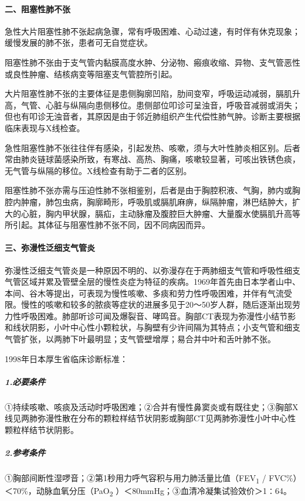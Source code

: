 \paragraph{二、阻塞性肺不张}

急性大片阻塞性肺不张起病急骤，常有呼吸困难、心动过速，有时伴有休克现象；缓慢发展的肺不张，患者可无自觉症状。

阻塞性肺不张由于支气管内黏膜高度水肿、分泌物、瘢痕收缩、异物、支气管恶性或良性肿瘤、结核病变等阻塞支气管腔所引起。

大片阻塞性肺不张的主要体征是患侧胸廓凹陷，肋间变窄，呼吸运动减弱，膈肌升高，气管、心脏与纵隔向患侧移位。患侧部位叩诊可呈浊音，呼吸音减弱或消失；但也有叩诊无浊音者，其原因是由于邻近肺组织产生代偿性肺气肿。诊断主要根据临床表现与X线检查。

急性阻塞性肺不张往往伴有感染，引起发热、咳嗽，须与大叶性肺炎相区别。后者常由肺炎链球菌感染所致，有寒战、高热、胸痛，咳嗽较显著，可咳出铁锈色痰，无气管与纵隔的移位。X线检查有助于二者的区别。

阻塞性肺不张亦需与压迫性肺不张相鉴别，后者是由于胸腔积液、气胸，肺内或胸腔内肿瘤，肺包虫病，胸廓畸形，呼吸肌或膈肌麻痹，纵隔肿瘤，淋巴结肿大，扩大的心脏，胸内甲状腺，膈疝，主动脉瘤及腹腔巨大肿瘤、大量腹水使膈肌升高等所引起。其体征与阻塞性肺不张不同，因不同病因而异。

\paragraph{三、弥漫性泛细支气管炎}

弥漫性泛细支气管炎是一种原因不明的、以弥漫存在于两肺细支气管和呼吸性细支气管区域并累及管壁全层的慢性炎症为特征的疾病。1969年首先由日本学者山中、本间、谷木等提出，可表现为慢性咳嗽、多痰和劳力性呼吸困难，并伴有气流受限。慢性的咳嗽和较多的脓痰等症状的进展多见于20～50岁人群，随后逐渐出现劳力性呼吸困难。肺部听诊可闻及爆裂音、哮鸣音。胸部CT表现为弥漫性小结节影和线状阴影，小叶中心性小颗粒状，与胸壁有少许间隔为其特点；小支气管和细支气管扩张，以两肺下叶最明显；支气管壁增厚；易合并中叶和舌叶肺不张。

1998年日本厚生省临床诊断标准：

\subparagraph{1.必要条件}

①持续咳嗽、咳痰及活动时呼吸困难；②合并有慢性鼻窦炎或有既往史；③胸部X线见两肺弥漫性散在分布的颗粒样结节状阴影或胸部CT见两肺弥漫性小叶中心性颗粒样结节状阴影。

\subparagraph{2.参考条件}

①胸部间断性湿啰音；②第1秒用力呼气容积与用力肺活量比值（FEV\textsubscript{1}
/ FVC\%）＜70\%，动脉血氧分压（PaO\textsubscript{2}
）＜80mmHg；③血清冷凝集试验效价＞1∶64。


